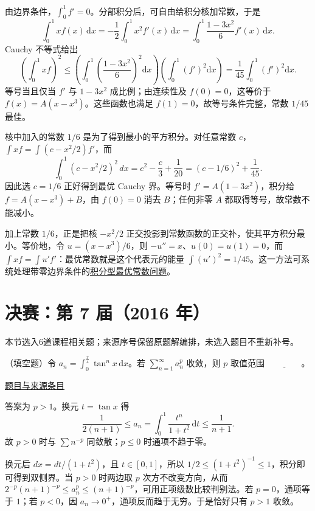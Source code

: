 \documentclass[12pt,fontset=fandol]{ctexart}
\begin{document}
\begin{solve}\label{ans:fin06-lo:9}

由边界条件，$\int_0^1f'=0$。分部积分后，可自由给积分核加常数，于是
\[
\int_0^1xf(x)\,\mathrm dx
=-\frac12\int_0^1x^2f'(x)\,\mathrm dx
=\int_0^1\frac{1-3x^2}{6}f'(x)\,\mathrm dx.
\]
Cauchy 不等式给出
\[
\left(\int_0^1xf\right)^2
\le\left(\int_0^1\left(\frac{1-3x^2}{6}\right)^2\mathrm dx\right)
\left(\int_0^1(f')^2\mathrm dx\right)
=\frac1{45}\int_0^1(f')^2\mathrm dx.
\]
等号当且仅当 $f'$ 与 $1-3x^2$ 成比例；由连续性及 $f(0)=0$，这等价于 $f(x)=A(x-x^3)$。这些函数也满足 $f(1)=0$，故等号条件完整，常数 $1/45$ 最佳。

核中加入的常数 $1/6$ 是为了得到最小的平方积分。对任意常数 $c$，$\int xf=\int(c-x^2/2)f'$，而
\[
\int_0^1(c-x^2/2)^2\,dx=c^2-\frac c3+\frac1{20}
=(c-1/6)^2+\frac1{45}.
\]
因此选 $c=1/6$ 正好得到最优 Cauchy 界。等号时 $f'=A(1-3x^2)$，积分给 $f=A(x-x^3)+B$，由 $f(0)=0$ 消去 $B$；任何非零 $A$ 都取得等号，故常数不能减小。

\end{solve}

\begin{remark}[方法与条件]加上常数 $1/6$，正是把核 $-x^2/2$ 正交投影到常数函数的正交补，使其平方积分最小。等价地，令 $u=(x-x^3)/6$，则 $-u''=x$、$u(0)=u(1)=0$，而 $\int xf=\int u'f'$：最优常数就是这个代表元的能量 $\int(u')^2=1/45$。这一方法可系统处理带零边界条件的\hyperref[app:inequality-energy]{积分型最优常数问题}。\end{remark}

\section{决赛：第 7 届（2016 年）}

本节选入6道课程相关题；来源序号保留原题解编排，未选入题目不重新补号。

\begin{example}[来源序号2]\label{ex:fin07-hi:2}\label{pr:fin07-hi:2}

（填空题）令 $a_{n}=\int_{0}^{\frac{\pi}{4}}\tan^{n}x\,\mathrm{d}x$。若 $\sum_{n=1}^{\infty}a_{n}^{p}$ 收敛，则 $p$ 取值范围 $\underline{\qquad\qquad}$。

\par\href{https://github.com/lzxcr/cmc-mathematics/blob/64916fa1fdbc3e444a652eca204d5669058ee321/src/problems/finals/07/02.md}{题目与来源条目}

\end{example}

\begin{solve}\label{ans:fin07-hi:2}

答案为 $p>1$。换元 $t=\tan x$ 得
\[
\frac{1}{2(n+1)}\leq a_n=\int_0^1\frac{t^n}{1+t^2}\,\mathrm{d}t\leq\frac{1}{n+1}.
\]
故 $p>0$ 时与 $\sum n^{-p}$ 同敛散；$p\leq0$ 时通项不趋于零。

换元后 $dx=dt/(1+t^2)$，且 $t\in[0,1]$，所以 $1/2\le(1+t^2)^{-1}\le1$，积分即可得到双侧界。当 $p>0$ 时两边取 $p$ 次方不改变方向，从而 $2^{-p}(n+1)^{-p}\le a_n^p\le(n+1)^{-p}$，可用正项级数比较判别法。若 $p=0$，通项等于 $1$；若 $p<0$，因 $a_n\to0^+$，通项反而趋于无穷。于是恰好只有 $p>1$ 收敛。

\end{solve}
\end{document}
